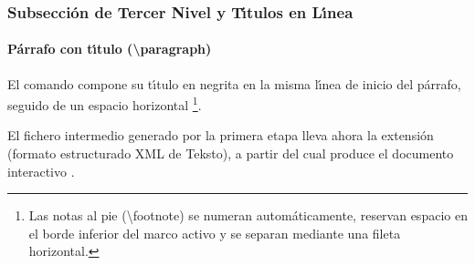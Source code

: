
\subsubsection{Subsecci\'on de Tercer Nivel y T\'{\i}tulos en L\'{\i}nea}

\paragraph{P\'arrafo con t\'{\i}tulo (\textbackslash paragraph)} El comando  compone su t\'{\i}tulo en negrita en la misma l\'{\i}nea de inicio del p\'arrafo, seguido de un espacio horizontal \footnote{Las notas al pie (\textbackslash footnote) se numeran autom\'aticamente, reservan espacio en el borde inferior del marco activo y se separan mediante una fileta horizontal.}.

\begin{aviso}
El fichero intermedio generado por la primera etapa lleva ahora la extensi\'on  (formato estructurado XML de Teksto), a partir del cual  produce el documento interactivo .
\end{aviso}
